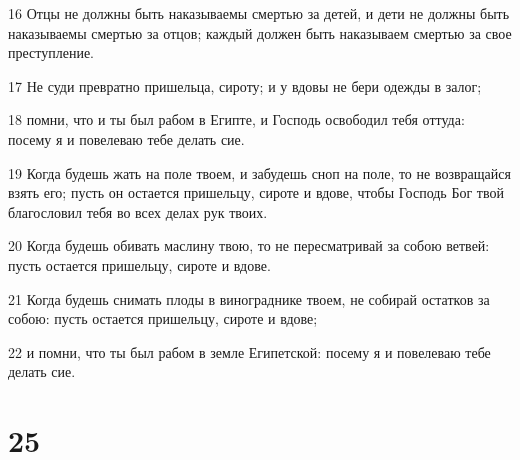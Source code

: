 \par 16 Отцы не должны быть наказываемы смертью за детей, и дети не должны быть наказываемы смертью за отцов; каждый должен быть наказываем смертью за свое преступление.
\par 17 Не суди превратно пришельца, сироту; и у вдовы не бери одежды в залог;
\par 18 помни, что и ты был рабом в Египте, и Господь освободил тебя оттуда: посему я и повелеваю тебе делать сие.
\par 19 Когда будешь жать на поле твоем, и забудешь сноп на поле, то не возвращайся взять его; пусть он остается пришельцу, сироте и вдове, чтобы Господь Бог твой благословил тебя во всех делах рук твоих.
\par 20 Когда будешь обивать маслину твою, то не пересматривай за собою ветвей: пусть остается пришельцу, сироте и вдове.
\par 21 Когда будешь снимать плоды в винограднике твоем, не собирай остатков за собою: пусть остается пришельцу, сироте и вдове;
\par 22 и помни, что ты был рабом в земле Египетской: посему я и повелеваю тебе делать сие.

\chapter{25}

